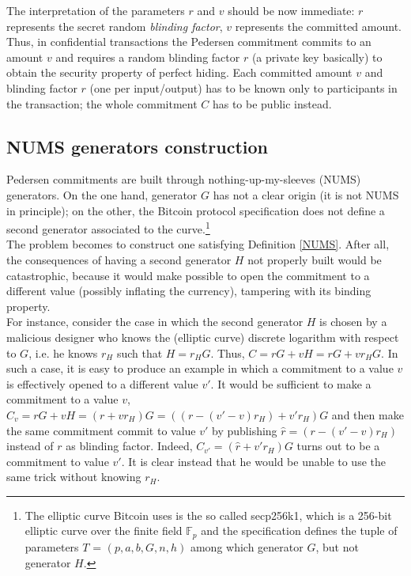 The interpretation of the parameters $r$ and $v$ should be now immediate: $r$ represents the secret random \textit{blinding factor}, $v$ represents the committed amount. Thus, in confidential transactions the Pedersen commitment commits to an amount $v$ and requires a random blinding factor $r$ (a private key basically) to obtain the security property of perfect hiding. Each committed amount $v$ and blinding factor $r$ (one per input/output) has to be known only to participants in the transaction; the whole commitment $C$ has to be public instead.

\subsection{NUMS generators construction}
\label{sec::NUMS_gen}
Pedersen commitments are built through nothing-up-my-sleeves (NUMS) generators. On the one hand, generator $G$ has not a clear origin (it is not NUMS in principle); on the other, the Bitcoin protocol specification does not define a second generator associated to the curve.\footnote{The elliptic curve Bitcoin uses is the so called secp256k1, which is a 256-bit elliptic curve over the finite field $\mathbb{F}_p$ and the specification defines the tuple of parameters $T$ = $(p, a, b, G, n, h)$ among which generator $G$, but not generator $H$.}\\
The problem becomes to construct one satisfying Definition \ref{NUMS}. After all, the consequences of having a second generator $H$ not properly built would be catastrophic, because it would make possible to open the commitment to a different value (possibly inflating the currency), tampering with its binding property.\\
For instance, consider the case in which the second generator $H$ is chosen by a malicious designer who knows the (elliptic curve) discrete logarithm with respect to $G$, i.e. he knows $r_H$ such that $H = r_HG$. Thus, $C = rG + vH = rG + vr_HG$. In such a case, it is easy to produce an example in which a commitment to a value $v$ is effectively opened to a different value $v'$. It would be sufficient to make a commitment to a value $v$, $C_v = rG + vH = (r + vr_H)G = ((r - (v'-v)r_H) + v'r_H)G$ and then make the same commitment commit to value $v'$ by publishing $\hat{r} = (r - (v'-v)r_H)$ instead of $r$ as blinding factor. Indeed, $C_{v'} = (\hat{r} + v'r_H)G$ turns out to be a commitment to value $v'$. It is clear instead that he would be unable to use the same trick without knowing $r_H$.\\
